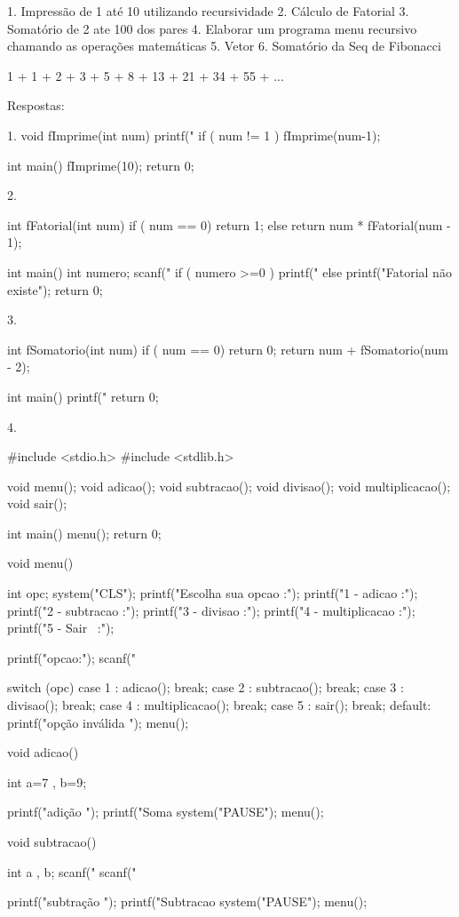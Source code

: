 1. Impressão de 1 até 10 utilizando recursividade
2. Cálculo de Fatorial
3. Somatório de 2 ate 100 dos pares
4. Elaborar um programa menu recursivo chamando as operações matemáticas
5. Vetor
6. Somatório da Seq de Fibonacci

1 + 1 + 2 + 3 + 5 + 8 + 13 + 21 + 34 + 55 + ...

Respostas:

1. 
void fImprime(int num) {
    printf("%
    if ( num != 1 ) 
      fImprime(num-1);
}

int main()
{   fImprime(10);
    return 0;
}

2. 

int fFatorial(int num) {
    if ( num == 0) return 1;
    else return num * fFatorial(num - 1);
}

int main()
{   int numero;
    scanf("%
    if ( numero >=0 )
	  printf("%
	else
	  printf("Fatorial não existe");
    return 0;
}

3.

int fSomatorio(int num) {
    if ( num == 0) return 0;
	 return num + fSomatorio(num - 2);
}

int main()
{  	printf("%
    return 0;
}

4. 

#include <stdio.h>
#include <stdlib.h>

void menu();
void adicao();
void subtracao();
void divisao();
void multiplicacao();
void sair();

int main()
{  	menu();
    return 0;
}

void menu(){
	int opc;
	system("CLS");
	printf("Escolha sua opcao \n \n:");
	printf("1 - adicao \n \n:");
	printf("2 - subtracao \n \n:");
	printf("3 - divisao \n \n:");
	printf("4 - multiplicacao \n \n:");
	printf("5 - Sair \n \ \n:");
	
	printf("opcao:");
	scanf("%
	
	switch (opc) {
	   case 1 : adicao(); break;
	   case 2 : subtracao(); break;
	   case 3 : divisao(); break;
	   case 4 : multiplicacao(); break;
	   case 5 : sair(); break;
	   default:
	      printf("opção inválida \n");
	      menu();
		}
}

void adicao(){
	int a=7 , b=9;
	
	printf("\nselecionou adição \n");
	printf("Soma %
	system("PAUSE");
    menu();
}

void subtracao(){
	int a , b;
	scanf("%
	scanf("%
	
	printf("\nselcionou subtração \n");
	printf("Subtracao %
	system("PAUSE");
	menu();
}

